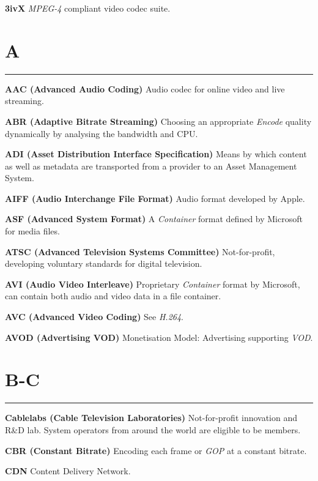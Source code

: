 
\textbf{3ivX}
\textit{MPEG-4} compliant video codec suite.

\section{A}
\hrule

\medskip
\textbf{AAC (Advanced Audio Coding)}
Audio codec for online video and live streaming.

\smallskip
\textbf{ABR (Adaptive Bitrate Streaming)}
Choosing an appropriate \textit{Encode} quality dynamically by analysing the bandwidth and CPU.

\smallskip
\textbf{ADI (Asset Distribution Interface Specification)}
Means by which content as well as metadata are transported from a provider to an Asset Management System.

\smallskip
\textbf{AIFF (Audio Interchange File Format)}
Audio format developed by Apple.

\smallskip
\textbf{ASF (Advanced System Format)}
A \textit{Container} format defined by Microsoft for media files.

\smallskip
\textbf{ATSC (Advanced Television Systems Committee)}
Not-for-profit, developing voluntary standards for digital television.

\smallskip
\textbf{AVI (Audio Video Interleave)}
Proprietary \textit{Container} format by Microsoft, can contain both audio and video data in a file container.

\smallskip
\textbf{AVC (Advanced Video Coding)}
See \textit{H.264}.

\smallskip
\textbf{AVOD (Advertising VOD)}
Monetisation Model: Advertising supporting \textit{VOD}.


\section{B-C}
\hrule

\medskip
\textbf{Cablelabs (Cable Television Laboratories)}
Not-for-profit innovation and R\&D lab. System operators from around the world are eligible to be members.

\smallskip
\textbf{CBR (Constant Bitrate)}
Encoding each frame or \textit{GOP} at a constant bitrate.

\smallskip
\textbf{CDN}
Content Delivery Network.

